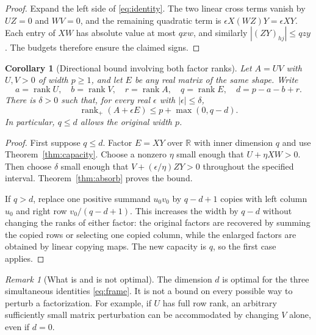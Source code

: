 \documentclass[11pt]{article}
\newtheorem{corollary}[theorem]{Corollary}
\theoremstyle{definition}\newtheorem{definition}[theorem]{Definition}
\theoremstyle{remark}\newtheorem{remark}[theorem]{Remark}
\newcommand{\rk}{\operatorname{rank}}
\newcommand{\rp}{\operatorname{rank}_{+}}
\newcommand{\R}{\mathbb R}
\begin{document}
\begin{proof}
Expand the left side of \eqref{eq:identity}. The two linear cross terms vanish by $UZ=0$ and $WV=0$, and the remaining quadratic term is $\epsilon X(WZ)Y=\epsilon XY$. Each entry of $XW$ has absolute value at most $qxw$, and similarly $|(ZY)_{hj}|\le qzy$. The budgets therefore ensure the claimed signs.
\end{proof}

\begin{corollary}[Directional bound involving both factor ranks]\label{cor:direction}
Let $A=UV$ with $U,V>0$ of width $p\ge1$, and let $E$ be any real matrix of the same shape. Write
\[
a=\rk U,\quad b=\rk V,\quad r=\rk A,\quad q=\rk E,\quad d=p-a-b+r.
\]
There is $\delta>0$ such that, for every real $\epsilon$ with $|\epsilon|\le\delta$,
\begin{equation}\label{eq:direction}
\rp(A+\epsilon E)\le p+\max(0,q-d).
\end{equation}
In particular, $q\le d$ allows the original width $p$.
\end{corollary}

\begin{proof}
First suppose $q\le d$. Factor $E=XY$ over $\R$ with inner dimension $q$ and use Theorem~\ref{thm:capacity}. Choose a nonzero $\eta$ small enough that $U+\eta XW>0$. Then choose $\delta$ small enough that $V+(\epsilon/\eta)ZY>0$ throughout the specified interval. Theorem~\ref{thm:absorb} proves the bound.

If $q>d$, replace one positive summand $u_0v_0$ by $q-d+1$ copies with left column $u_0$ and right row $v_0/(q-d+1)$. This increases the width by $q-d$ without changing the ranks of either factor: the original factors are recovered by summing the copied rows or selecting one copied column, while the enlarged factors are obtained by linear copying maps. The new capacity is $q$, so the first case applies.
\end{proof}

\begin{remark}[What is and is not optimal]
The dimension $d$ is optimal for the three simultaneous identities \eqref{eq:frame}. It is not a bound on every possible way to perturb a factorization. For example, if $U$ has full row rank, an arbitrary sufficiently small matrix perturbation can be accommodated by changing $V$ alone, even if $d=0$.
\end{remark}
\end{document}
